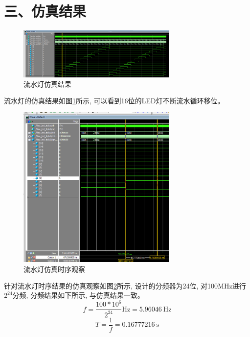 \documentclass{article}
\newcommand{\fourhao}{\fontsize{14pt}{\baselineskip}\selectfont} %
\newcommand{\xiaosihao}{\fontsize{12pt}{\baselineskip}\selectfont} %
\begin{document}
\section*{\fourhao 三、仿真结果}
\xiaosihao
{}
\begin{figure}[htbp]
    \centering
    \includegraphics[width=0.7\textwidth]{image/2024-06-28-13-02-04.png}
    \caption{流水灯仿真结果}
    \label{image_led_sim_1}
\end{figure}
流水灯的仿真结果如图\ref{image_led_sim_1}所示, 可以看到16位的LED灯不断流水循环移位。\\
\newpage
\begin{figure}[htbp]
    \centering
    \includegraphics[width=0.7\textwidth]{image/2024-06-28-13-04-00.png}
    \caption{流水灯仿真时序观察}
    \label{image_led_sim_2}
\end{figure}
针对流水灯时序结果的仿真观察如图\ref{image_led_sim_2}所示, 设计的分频器为24位, 对100MHz进行$2^{24}$分频, 分频结果如下所示, 与仿真结果一致。
\begin{equation}
    f = \frac{100*10^6}{2^{24}} \si{\hertz} = \SI{5.96046}{\hertz}
\end{equation}
\begin{equation}
    T = \frac{1}{f} = \SI{0.16777216}{\second}
\end{equation}
\end{document}
